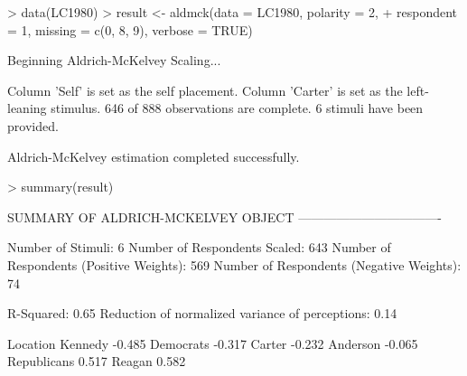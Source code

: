 \documentclass[nojss]{jss}
\begin{document}
\begin{Schunk}
\begin{Sinput}
> data(LC1980)
> result <- aldmck(data = LC1980, polarity = 2, 
+     respondent = 1, missing = c(0, 8, 9), verbose = TRUE)
\end{Sinput}
\begin{Soutput}
	Beginning Aldrich-McKelvey Scaling...

		Column 'Self' is set as the self placement.
		Column 'Carter' is set as the left-leaning stimulus.
		646 of 888 observations are complete.
		6 stimuli have been provided.

	Aldrich-McKelvey estimation completed successfully.
\end{Soutput}
\begin{Sinput}
> summary(result)
\end{Sinput}
\begin{Soutput}
SUMMARY OF ALDRICH-MCKELVEY OBJECT
----------------------------------

Number of Stimuli: 6
Number of Respondents Scaled: 643
Number of Respondents (Positive Weights): 569
Number of Respondents (Negative Weights): 74

R-Squared: 0.65
Reduction of normalized variance of perceptions: 0.14 

            Location
Kennedy       -0.485
Democrats     -0.317
Carter        -0.232
Anderson      -0.065
Republicans    0.517
Reagan         0.582
\end{Soutput}
\end{Schunk}
\end{document}

